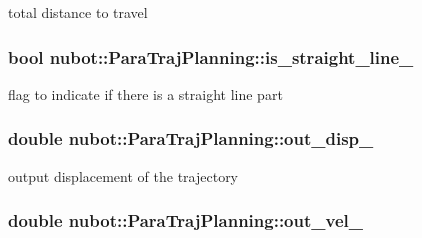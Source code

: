 total distance to travel 

\hypertarget{classnubot_1_1ParaTrajPlanning_a3a03e2c86a799f827aef25d1d928910e}{
\subsubsection[{is\-\_\-straight\-\_\-line\-\_\-}]{\setlength{\rightskip}{0pt plus 5cm}bool nubot\-::\-Para\-Traj\-Planning\-::is\-\_\-straight\-\_\-line\-\_\-\hspace{0.3cm}{\ttfamily [private]}}}\label{classnubot_1_1ParaTrajPlanning_a3a03e2c86a799f827aef25d1d928910e}


flag to indicate if there is a straight line part 

\hypertarget{classnubot_1_1ParaTrajPlanning_a7d262f02f46b3897de76310c50c082c0}{
\subsubsection[{out\-\_\-disp\-\_\-}]{\setlength{\rightskip}{0pt plus 5cm}double nubot\-::\-Para\-Traj\-Planning\-::out\-\_\-disp\-\_\-\hspace{0.3cm}{\ttfamily [private]}}}\label{classnubot_1_1ParaTrajPlanning_a7d262f02f46b3897de76310c50c082c0}


output displacement of the trajectory 

\hypertarget{classnubot_1_1ParaTrajPlanning_a5fccc5e03134a9d4b796561ffb93c19c}{
\subsubsection[{out\-\_\-vel\-\_\-}]{\setlength{\rightskip}{0pt plus 5cm}double nubot\-::\-Para\-Traj\-Planning\-::out\-\_\-vel\-\_\-\hspace{0.3cm}{\ttfamily [private]}}}\label{classnubot_1_1ParaTrajPlanning_a5fccc5e03134a9d4b796561ffb93c19c}


